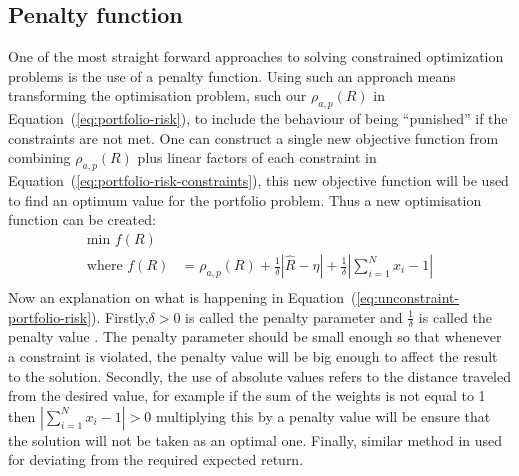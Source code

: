     \subsection{Penalty function} %
    \label{sub:penalty_function}
    One of the most straight forward approaches to solving constrained optimization problems is the use of a penalty function\cite{constraint}. Using such an approach means transforming the optimisation problem, such our $\rho_{a,p}(R)$ in Equation~(\ref{eq:portfolio-risk}), to include the behaviour of being ``punished'' if the constraints are not met. One can construct a single new objective function from combining $\rho_{a,p}(R)$ plus linear factors of each constraint in Equation~(\ref{eq:portfolio-risk-constraints}), this new objective function will be used to find an optimum value for the portfolio problem. Thus a new optimisation function can be created:
      \begin{equation} \label{eq:unconstraint-portfolio-risk}
        \begin{split}
          \text{min } f(R) & \\
          \text{where } 
          f(R) & = \rho_{a,p}(R) + \frac{1}{\delta}|\widehat{R}-\eta| + \frac{1}{\delta}|\sum\limits_{i=1}^N x_i -1| \\
        \end{split}
      \end{equation}
    Now an explanation on what is happening in Equation~(\ref{eq:unconstraint-portfolio-risk}). Firstly,$\delta > 0$ is called the penalty parameter and $\frac{1}{\delta}$ is called the penalty value \cite{constraint}. The penalty parameter should be small enough so that whenever a constraint is violated, the penalty value will be big enough to affect the result to the solution. Secondly, the use of absolute values refers to the distance traveled from the desired value, for example if the sum of the weights is not equal to 1 then $|\sum\limits_{i=1}^N x_i -1| > 0$ multiplying this by a penalty value will be ensure that the solution will not be taken as an optimal one. Finally, similar method in used for deviating from the required expected return. 

